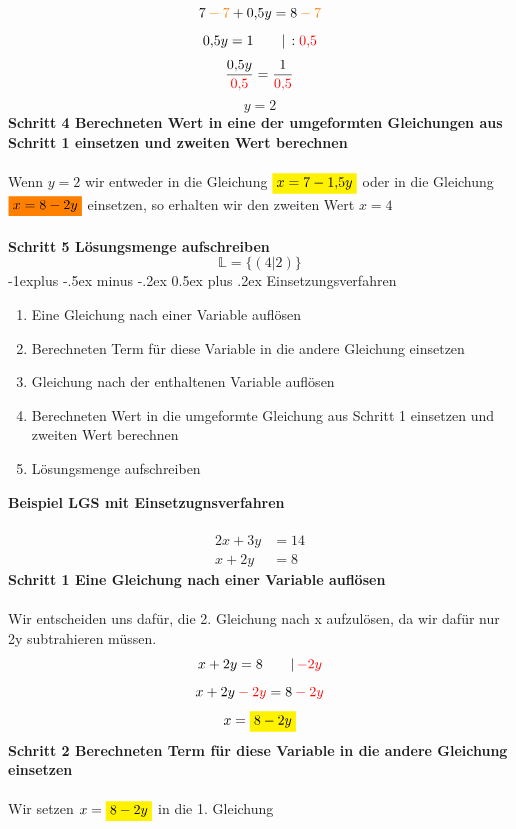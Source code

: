 \documentclass[a4paper,10pt]{article}
\makeatletter
\renewcommand{\subsection}{\@startsection{subsection}{2}{0mm}%
                                {-1explus -.5ex minus -.2ex}%
                                {0.5ex plus .2ex}%
                                {\normalfont\normalsize\bfseries}}
\makeatother
\begin{document}
\begin{multicols}{3}
    \[7 {\color{orange} \: - \: 7} + 0{,}5y = 8 {\color{orange}\: - \: 7}\]
    \[0{,}5y = 1 \qquad |\, :{\color{red}0{,}5}\]
    \[\frac{0{,}5y}{{\color{red}0{,}5}} = \frac{1}{{\color{red}0{,}5}}\]
    \[y = 2\]
    \textbf{Schritt 4 Berechneten Wert in eine der umgeformten Gleichungen aus Schritt 1 einsetzen und zweiten Wert berechnen}\\~\\
    Wenn $y = 2$ wir entweder in die Gleichung ${\colorbox{yellow}{$x = 7 - 1{,}5y$}}$ oder in die Gleichung ${\colorbox{orange}{$x = 8 - 2y$}}$  einsetzen, so erhalten wir den zweiten Wert $x = 4$ \\~\\
    \textbf{Schritt 5 Lösungsmenge aufschreiben}
    \[\mathbb{L} = \{(4|2)\}\]
    \subsection{Einsetzungsverfahren}
    \begin{enumerate}
        \item     Eine Gleichung nach einer Variable auflösen
        \item     Berechneten Term für diese Variable in die andere Gleichung einsetzen
        \item     Gleichung nach der enthaltenen Variable auflösen
        \item     Berechneten Wert in die umgeformte Gleichung aus Schritt 1 einsetzen und zweiten Wert berechnen
        \item     Lösungsmenge aufschreiben
    \end{enumerate}
    \textbf{Beispiel LGS mit Einsetzugnsverfahren}\\~\\
    \begin{align*} 2x + 3y &= 14 \\ x + 2y &= 8 \end{align*}
    \textbf{Schritt 1 Eine Gleichung nach einer Variable auflösen}\\~\\
    Wir entscheiden uns dafür, die 2. Gleichung nach x aufzulösen, da wir dafür nur 2y subtrahieren müssen.
    \[x + 2y = 8 \qquad |\, {\color{red}-2y}\]
    \[x + 2y {\color{red}\: - \: 2y} = 8 {\color{red}\: - \: 2y}\]
    \[x = {\colorbox{yellow}{$8 - 2y$}}\]
    \textbf{Schritt 2 Berechneten Term für diese Variable in die andere Gleichung einsetzen}\\~\\
    Wir setzen $x = {\colorbox{yellow}{$8 - 2y$}}$ in die 1. Gleichung

\end{multicols}
\end{document}
